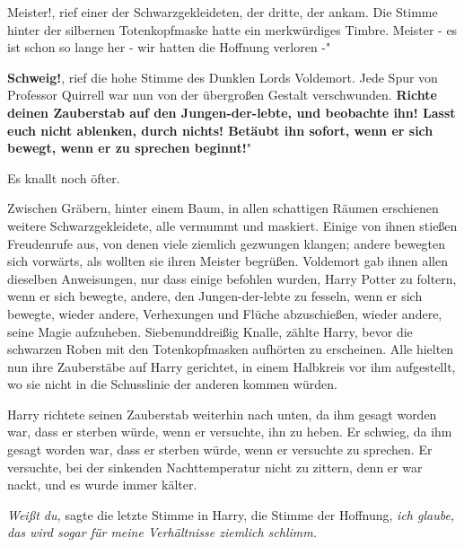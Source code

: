 \glqq Meister!\grqq{}, rief einer der Schwarzgekleideten, der dritte, der ankam.
Die Stimme hinter der silbernen Totenkopfmaske hatte ein merkwürdiges Timbre.
\glqq Meister - es ist schon so lange her - wir hatten die Hoffnung verloren -"

\glqq \textbf{Schweig!}\grqq{}, rief die hohe Stimme des Dunklen Lords
Voldemort. Jede Spur von Professor Quirrell war nun von der übergroßen Gestalt
verschwunden. \glqq \textbf{Richte deinen Zauberstab auf den Jungen-der-lebte,
und beobachte ihn! Lasst euch nicht ablenken, durch nichts! Betäubt ihn sofort,
wenn er sich bewegt, wenn er zu sprechen beginnt!}"

Es knallt noch öfter.

Zwischen Gräbern, hinter einem Baum, in allen schattigen Räumen erschienen
weitere Schwarzgekleidete, alle vermummt und maskiert. Einige von ihnen stießen
Freudenrufe aus, von denen viele ziemlich gezwungen klangen; andere bewegten
sich vorwärts, als wollten sie ihren Meister begrüßen. Voldemort gab ihnen allen
dieselben Anweisungen, nur dass einige befohlen wurden, Harry Potter zu foltern,
wenn er sich bewegte, andere, den Jungen-der-lebte zu fesseln, wenn er sich
bewegte, wieder andere, Verhexungen und Flüche abzuschießen, wieder andere,
seine Magie aufzuheben. Siebenunddreißig Knalle, zählte Harry, bevor die
schwarzen Roben mit den Totenkopfmasken aufhörten zu erscheinen. Alle hielten
nun ihre Zauberstäbe auf Harry gerichtet, in einem Halbkreis vor ihm
aufgestellt, wo sie nicht in die Schusslinie der anderen kommen würden.

Harry richtete seinen Zauberstab weiterhin nach unten, da ihm gesagt worden war,
dass er sterben würde, wenn er versuchte, ihn zu heben. Er schwieg, da ihm
gesagt worden war, dass er sterben würde, wenn er versuchte zu sprechen. Er
versuchte, bei der sinkenden Nachttemperatur nicht zu zittern, denn er war
nackt, und es wurde immer kälter.

\emph{Weißt du,} sagte die letzte Stimme in Harry, die Stimme der Hoffnung,
\emph{ich glaube, das wird sogar für meine Verhältnisse ziemlich schlimm.}

